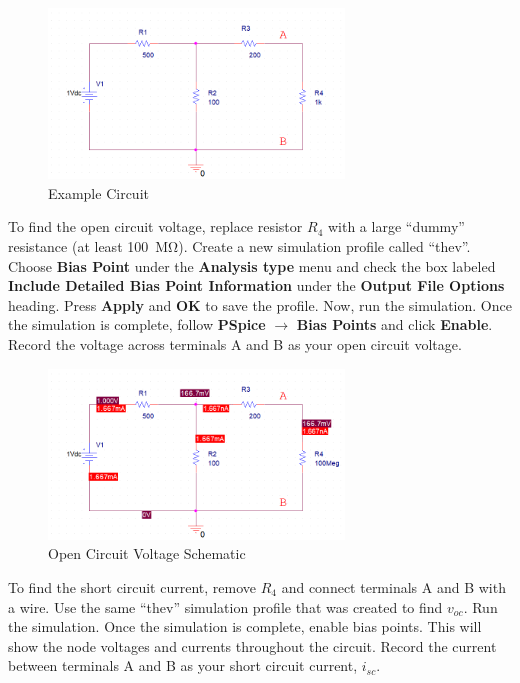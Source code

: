 \documentclass[12pt]{../manual}
\begin{document}
\begin{figure}[ht!]
\begin{center}
\includegraphics[width=0.7\textwidth]{figures/ExampleCircuitSchematicCrop.PNG}
\caption{Example Circuit}
\label{fig:exampleCircuit}
\end{center}
\end{figure}

To find the open circuit voltage, replace resistor $R_4$ with a large ``dummy'' resistance (at least \SI{100}{\mega\ohm}). Create a new simulation profile called ``thev''. Choose \textbf{Bias Point} under the \textbf{Analysis type} menu and check the box labeled \textbf{Include Detailed Bias Point Information} under the \textbf{Output File Options} heading. Press \textbf{Apply} and \textbf{OK} to save the profile. Now, run the simulation. Once the simulation is complete, follow \textbf{PSpice} $\to$ \textbf{Bias Points} and click \textbf{Enable}. Record the voltage across terminals A and B as your open circuit voltage.

\begin{figure}[ht!]
\begin{center}
\includegraphics[width=0.7\textwidth]{figures/OpenCircuitSchematicCrop.PNG}
\caption{Open Circuit Voltage Schematic}
\label{fig:openCircuit}
\end{center}
\end{figure}

To find the short circuit current, remove $R_4$ and connect terminals A and B with a wire.
Use the same ``thev'' simulation profile that was created to find $v_{oc}$. Run the simulation. Once the simulation is complete, enable bias points. This will show the node voltages and currents throughout the circuit. Record the current between terminals A and B as your short circuit current, $i_{sc}$.
\end{document}
